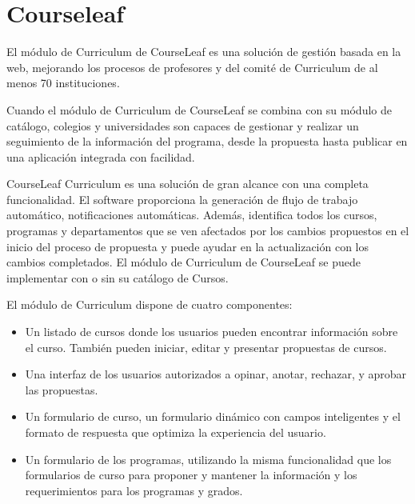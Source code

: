 \section{Courseleaf}
El módulo de Curriculum de CourseLeaf es una solución de gestión basada en la web, mejorando los procesos de profesores y del comité de Curriculum de al menos 70 instituciones.

Cuando el módulo de Curriculum de CourseLeaf se combina con su módulo de catálogo, colegios y universidades son capaces de gestionar y realizar un seguimiento de la información del programa, desde la propuesta hasta publicar en una aplicación integrada con facilidad.

CourseLeaf Curriculum es una solución de gran alcance con una completa funcionalidad. El software proporciona la generación de flujo de trabajo automático, notificaciones automáticas. Además, identifica todos los cursos, programas y departamentos que se ven afectados por los cambios propuestos en el inicio del proceso de propuesta y puede ayudar en la actualización con los cambios completados. El módulo de Curriculum de CourseLeaf se puede implementar con o sin su catálogo de Cursos.

El módulo de Curriculum dispone de cuatro componentes:
\begin{itemize}
	\item Un listado de cursos donde los usuarios pueden encontrar información sobre el curso. También pueden iniciar, editar y presentar propuestas de cursos.
	\item Una interfaz de los usuarios autorizados a opinar, anotar, rechazar, y aprobar las propuestas.
	\item Un formulario de curso, un formulario dinámico con campos inteligentes y el formato de respuesta que optimiza la experiencia del usuario.
	\item Un formulario de los programas, utilizando la misma funcionalidad que los formularios de curso para proponer y mantener la información y los requerimientos para los programas y grados.
\end{itemize}